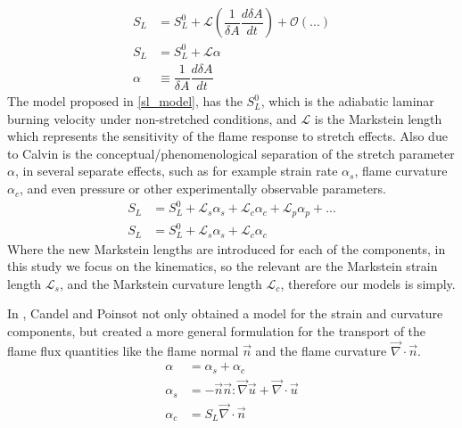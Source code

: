 \begin{assumption}
\begin{align}
	S_L&=S_L^0 + \mathscr{L}\left( \dfrac{1}{\delta A} \dfrac{d \delta A}{dt}\right)+\mathcal{O}(...)\nonumber \\ 
	S_L&=S_L^0 + \mathscr{L}\alpha \label{sl_model} \\
	\alpha &\equiv \dfrac{1}{\delta A} \dfrac{d \delta A}{dt}
\end{align}	 
The model proposed in \eqref{sl_model}, has the $S_L^0$, which is the adiabatic laminar burning velocity under non-stretched conditions, and $\mathscr{L}$ is the Markstein length which represents the sensitivity of the flame response to stretch effects.
Also due to Calvin is the conceptual/phenomenological separation of the stretch parameter $\alpha$, in several separate effects, such as for example strain rate $\alpha_s$, flame curvature $\alpha_c$, and even pressure or other experimentally observable parameters. 
\begin{align}
	S_L&= S_L^0 + \mathscr{L}_s \alpha_s+ \mathscr{L}_c \alpha_c + \mathscr{L}_p \alpha_p + ... \nonumber \\
	S_L&=S_L^0 + \mathscr{L}_s \alpha_s+ \mathscr{L}_c \alpha_c 
\end{align}
Where the new Markstein lengths are introduced for each of the components, in this study we focus on the kinematics, so the relevant are the Markstein strain length $\mathscr{L}_s$, and the Markstein curvature length $\mathscr{L}_c$, therefore our models is simply. 

\end{assumption}
	
\begin{theorem}
In \cite{candel_1990}, Candel and Poinsot not only obtained a model for the strain and curvature components, but created a more general formulation for the transport of the flame flux quantities like the flame normal $\vec{n}$ and the flame curvature $\vec{\nabla}\cdot \vec{n}$.
\begin{align}
	\alpha &=\alpha_s + \alpha_c\\
	\alpha_s&= -\vec{n} \vec{n}:\vec{\nabla} \vec{u}+ \vec{\nabla}\cdot \vec{u}\\
	\alpha_c&= S_L \vec{\nabla}\cdot \vec{n}
\end{align}
\end{theorem}


